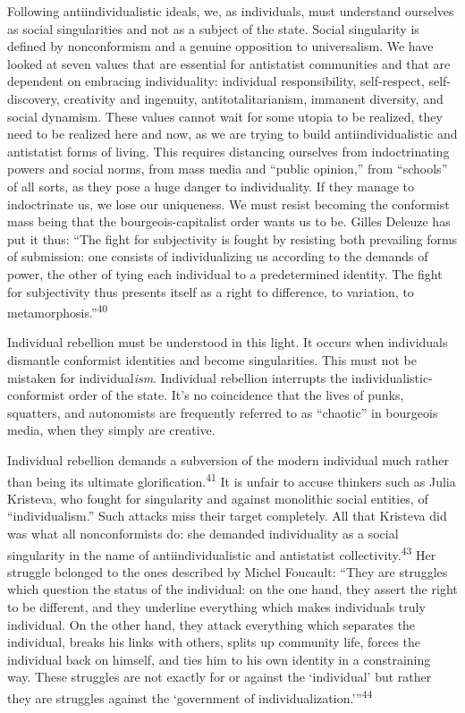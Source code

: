 Following antiindividualistic ideals, we, as individuals, must understand
ourselves as social singularities and not as a subject of the state. Social
singularity is defined by nonconformism and a genuine opposition to
universalism. We have looked at seven values that are essential for antistatist
communities and that are dependent on embracing individuality: individual
responsibility, self-respect, self-discovery, creativity and ingenuity,
antitotalitarianism, immanent diversity, and social dynamism. These values
cannot wait for some utopia to be realized, they need to be realized here and
now, as we are trying to build antiindividualistic and antistatist forms of
living. This requires distancing ourselves from indoctrinating powers and social
norms, from mass media and “public opinion,” from “schools” of all sorts, as
they pose a huge danger to individuality. If they manage to indoctrinate us, we
lose our uniqueness. We must resist becoming the conformist mass being that the
bourgeois-capitalist order wants us to be. Gilles Deleuze has put it thus: “The
fight for subjectivity is fought by resisting both prevailing forms of
submission: one consists of individualizing us according to the demands of
power, the other of tying each individual to a predetermined identity. The fight
for subjectivity thus presents itself as a right to difference, to variation, to
metamorphosis.”\textsuperscript{40}

Individual rebellion must be understood in this light. It occurs when
individuals dismantle conformist identities and become singularities. This must
not be mistaken for individual\textit{ism}. Individual rebellion interrupts the
individualistic-conformist order of the state. It’s no coincidence that the
lives of punks, squatters, and autonomists are frequently referred to as
“chaotic” in bourgeois media, when they simply are creative.

Individual rebellion demands a subversion of the modern individual much rather
than being its ultimate glorification.\textsuperscript{41} It is unfair to
accuse thinkers such as Julia Kristeva, who fought for singularity and against
monolithic social entities, of “individualism.” Such attacks miss their target
completely. All that Kristeva did was what all nonconformists do: she demanded
individuality as a social singularity in the name of antiindividualistic and
antistatist collectivity.\textsuperscript{43} Her struggle belonged to the ones
described by Michel Foucault: “They are struggles which question the status of
the individual: on the one hand, they assert the right to be different, and they
underline everything which makes individuals truly individual. On the other
hand, they attack everything which separates the individual, breaks his links
with others, splits up community life, forces the individual back on himself,
and ties him to his own identity in a constraining way. These struggles are not
exactly for or against the ‘individual’ but rather they are struggles against
the ‘government of individualization.’”\textsuperscript{44}

